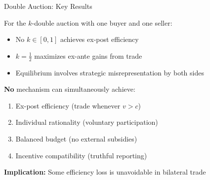 \documentclass[xcolor={x11names}, aspectratio=169 ]{beamer}
\begin{document}
\begin{frame}{Double Auction: Key Results}
\begin{theorem}
For the $k$-double auction with one buyer and one seller:
\begin{itemize}
  \item No $k \in [0,1]$ achieves ex-post efficiency
  \item $k = \frac{1}{2}$ maximizes ex-ante gains from trade
  \item Equilibrium involves strategic misrepresentation by both sides
\end{itemize}
\end{theorem}

\begin{tcolorbox}[colback=blue!5!white,colframe=blue!75!black,title=Myerson-Satterthwaite Impossibility (1983)]
\textbf{No} mechanism can simultaneously achieve:
\begin{enumerate}
  \item Ex-post efficiency (trade whenever $v > c$)
  \item Individual rationality (voluntary participation)
  \item Balanced budget (no external subsidies)
  \item Incentive compatibility (truthful reporting)
\end{enumerate}
\end{tcolorbox}

\textbf{Implication:} Some efficiency loss is unavoidable in bilateral trade
\end{frame}
\end{document}
